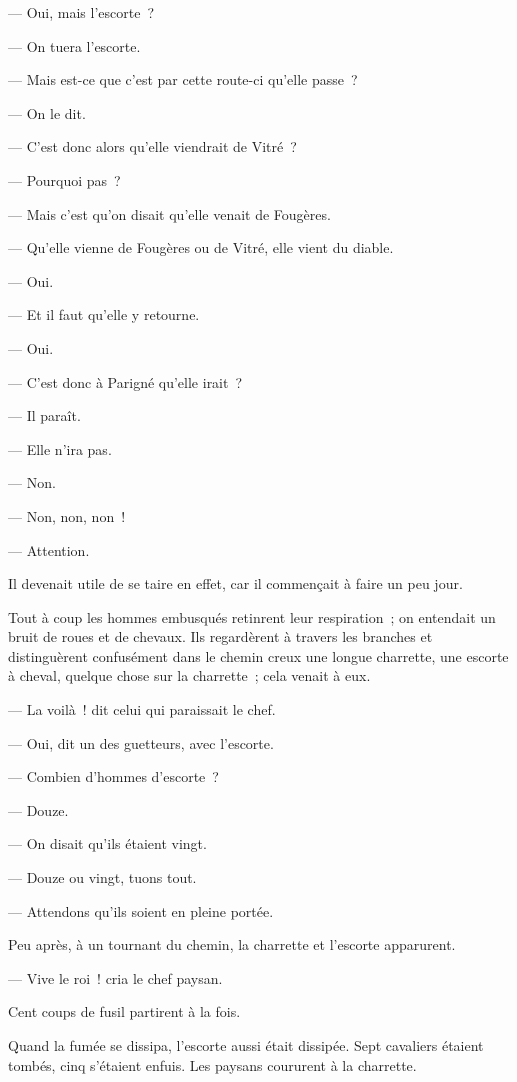 \documentclass[french,twoside]{book} %
\begin{document}
— Oui, mais l’escorte ?\par
— On tuera l’escorte.\par
— Mais est-ce que c’est par cette route-ci qu’elle passe ?\par
— On le dit.\par
— C’est donc alors qu’elle viendrait de Vitré ?\par
— Pourquoi pas ?\par
— Mais c’est qu’on disait qu’elle venait de Fougères.\par
— Qu’elle vienne de Fougères ou de Vitré, elle vient du diable.\par
 — Oui.\par
— Et il faut qu’elle y retourne.\par
— Oui.\par
— C’est donc à Parigné qu’elle irait ?\par
— Il paraît.\par
— Elle n’ira pas.\par
— Non.\par
— Non, non, non !\par
— Attention.\par
Il devenait utile de se taire en effet, car il commençait à faire un peu jour.\par
Tout à coup les hommes embusqués retinrent leur respiration ; on entendait un bruit de roues et de chevaux. Ils regardèrent à travers les branches et distinguèrent confusément dans le chemin creux une longue charrette, une escorte à cheval, quelque chose sur la charrette ; cela venait à eux.\par
— La voilà ! dit celui qui paraissait le chef.\par
— Oui, dit un des guetteurs, avec l’escorte.\par
— Combien d’hommes d’escorte ?\par
— Douze.\par
— On disait qu’ils étaient vingt.\par
— Douze ou vingt, tuons tout.\par
— Attendons qu’ils soient en pleine portée.\par
Peu après, à un tournant du chemin, la charrette et l’escorte apparurent.\par
— Vive le roi ! cria le chef paysan.\par
Cent coups de fusil partirent à la fois.\par
Quand la fumée se dissipa, l’escorte aussi était  dissipée. Sept cavaliers étaient tombés, cinq s’étaient enfuis. Les paysans coururent à la charrette.\par
\end{document}
